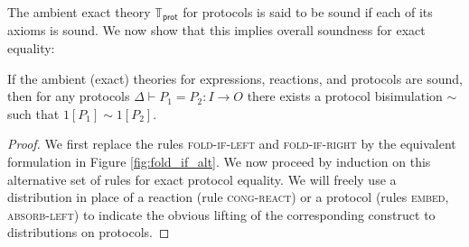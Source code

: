 \noindent The ambient exact \ipdl theory $\mathbb{T}_\mathsf{prot}$ for protocols is said to be sound if each of its axioms is sound. We now show that this implies overall soundness for exact equality:

\begin{lemma}
If the ambient (exact) \ipdl theories for expressions, reactions, and protocols are sound, then for any protocols $\Delta \vdash P_1 = P_2 : I \to O$ there exists a protocol bisimulation $\sim$ such that $1[P_1] \sim 1[P_2]$.
\end{lemma}

\begin{proof}
We first replace the rules \textsc{fold-if-left} and \textsc{fold-if-right} by the equivalent formulation in Figure \ref{fig:fold_if_alt}. We now proceed by induction on this alternative set of rules for exact protocol equality. We will freely use a distribution in place of a reaction (rule \textsc{cong-react}) or a protocol (rules \textsc{embed}, \textsc{absorb-left}) to indicate the obvious lifting of the corresponding construct to distributions on protocols.


\end{proof}
